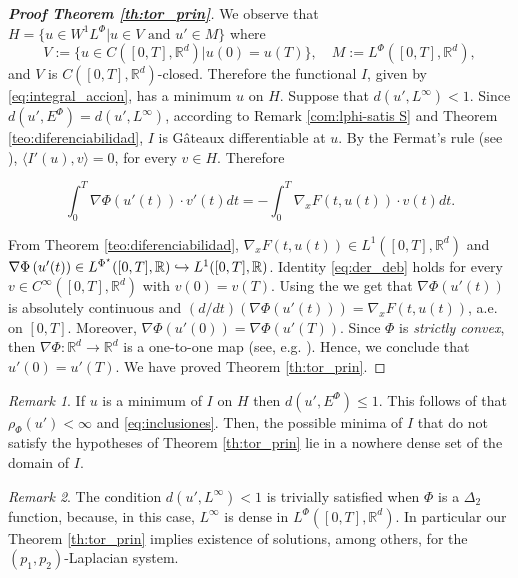 \documentclass[twoside]{article}
\theoremstyle{remark}
\newtheorem{comentario}{Remark}
\newcommand{\lphi}{L^{\Phi}}
\newcommand{\lpsi}{L^{\Phi^{\star}}}
\newcommand{\ephi}{E^{\Phi}}
\newcommand{\wphi}{W^{1}\lphi}
\newcommand{\rr}{\mathbb{R}}
\renewcommand{\leq}{\leqslant}
\begin{document}
\begin{proof}[\textbf{Proof Theorem \ref{th:tor_prin}}] We observe that $H=\{u\in \wphi | u\in V\text{ and } u'\in M\}$ where 
\[V:=\{u\in C([0,T],\rr^d)|u(0)=u(T)\},\quad M:=\lphi([0,T],\rr^d),\]
and $V$ is $C([0,T],\rr^d)$-closed. Therefore the functional $I$, given by \eqref{eq:integral_accion}, has a minimum $u$ on  $H$. Suppose that $d(u',L^{\infty})<1$.
Since $d(u',\ephi)=d(u',L^{\infty})$, according to Remark \ref{com:lphi-satis S} and Theorem \ref{teo:diferenciabilidad}, $I$ is G\^ateaux differentiable at $u$. By the Fermat's rule (see \cite[Prop. 4.12]{clarke2013functional}), $\langle I'(u),v\rangle=0$, for every $v\in H$. Therefore

\begin{equation}\label{eq:der_deb}\int_0^T\nabla\Phi(u'(t))\cdot v'(t)dt=-\int_0^T \nabla_xF(t,u(t))\cdot v(t)dt.\end{equation}

From Theorem \ref{teo:diferenciabilidad}, $\nabla_xF(t,u(t))\in L^1([0,T],\rr^d)$ and  $\nabla\Phi\left(u'(t)\right)\in\linebreak\lpsi([0,T],\rr)\hookrightarrow L^1([0,T],\rr)$.  Identity \eqref{eq:der_deb} holds for every $v\in C^{\infty} ([0,T],\rr^d)$ with $v(0)=v(T)$. Using the \cite[Fundamental Lemma, p. 6]{mawhin2010critical} we get that $\nabla\Phi(u'(t))$ is absolutely continuous and $(d/dt)\left(\nabla\Phi(u'(t))\right) = \nabla_xF(t,u(t))$, a.e. on $[0,T]$. Moreover, $\nabla\Phi(u'(0))=\nabla\Phi(u'(T))$. Since  $\Phi$ is \emph{strictly convex},  then  $\nabla\Phi:\mathbb{R}^d\to\mathbb{R}^d$ is a one-to-one map  (see, e.g. \cite[Ex. 4.17, p. 67]{clarke2013functional}). Hence, we conclude that $u'(0)=u'(T)$.  We have proved Theorem \ref{th:tor_prin}.
\end{proof}



\begin{comentario} If $u$ is a minimum of $I$ on $H$ then  $d(u',\ephi)\leq 1$. This follows of  that $\rho_{\Phi}(u')<\infty$ and \eqref{eq:inclusiones}. Then, the possible minima of $I$ that do not satisfy the hypotheses of  Theorem \ref{th:tor_prin} lie in a nowhere dense set of the domain of $I$.
 
\end{comentario}

\begin{comentario} The condition $d(u',L^{\infty})< 1$ is trivially satisfied when $\Phi$ is a $\Delta_2$ function, because, in this case, $L^{\infty}$ is dense in $\lphi([0,T],\rr^d)$. In particular our Theorem \ref{th:tor_prin} implies existence of solutions, among others, for the $(p_1,p_2)$-Laplacian system. 
\end{comentario}
\end{document}
